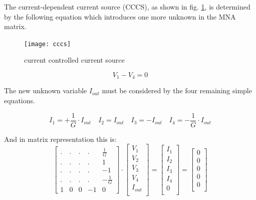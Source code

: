 The current-dependent current source (CCCS), as shown in fig.
\ref{fig:cccs}, is determined by the following equation which
introduces one more unknown in the MNA matrix.

\begin{figure}[ht]
\begin{center}
\texttt{[image: cccs]}
\end{center}
\caption{current controlled current source}
\label{fig:cccs}
\end{figure}
\FloatBarrier

\begin{equation}
V_{1} - V_{4} = 0
\label{eq:cccs}
\end{equation}

The new unknown variable $I_{out}$ must be considered by the four
remaining simple equations.

\begin{equation}
I_{1} = +\frac{1}{G}\cdot I_{out} \quad I_{2} = I_{out} \quad I_{3} = -I_{out} \quad I_{4} = -\frac{1}{G}\cdot I_{out}
\end{equation}

And in matrix representation this is:
\begin{equation}
\begin{bmatrix}
.&.&.&.& \frac{1}{G}\\
.&.&.&.& 1\\
.&.&.&.& -1\\
.&.&.&.& -\frac{1}{G}\\
1 & 0 & 0 & -1 & 0
\end{bmatrix}
\cdot
\begin{bmatrix}
V_{1}\\
V_{2}\\
V_{3}\\
V_{4}\\
I_{out}\\
\end{bmatrix}
=
\begin{bmatrix}
I_{1}\\
I_{2}\\
I_{3}\\
I_{4}\\
0\\
\end{bmatrix}
=
\begin{bmatrix}
0\\
0\\
0\\
0\\
0\\
\end{bmatrix}
\end{equation}


